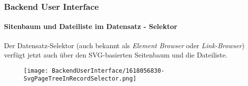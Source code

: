 %

\begin{frame}[fragile]
	\frametitle{Backend User Interface}
	\framesubtitle{Sitenbaum und Dateiliste im Datensatz - Selektor}

	Der Datensatz-Selektor (auch bekannt als \textit{Element Browser} oder \textit{Link-Browser})
	verfügt jetzt auch über den SVG-basierten Seitenbaum und die Dateiliste.

	\begin{figure}
		\texttt{[image: BackendUserInterface/1618056830-SvgPageTreeInRecordSelector.png]}
	\end{figure}

\end{frame}

